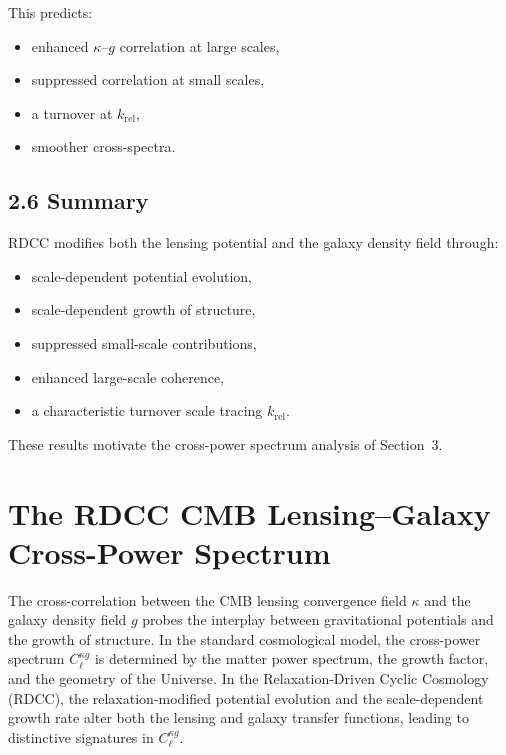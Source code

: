 \documentclass[11pt,a4paper]{article}
\begin{document}
This predicts:

\begin{itemize}
    \item enhanced $\kappa$–$g$ correlation at large scales,
    \item suppressed correlation at small scales,
    \item a turnover at $k_{\mathrm{rel}}$,
    \item smoother cross-spectra.
\end{itemize}

\subsection*{2.6 Summary}

RDCC modifies both the lensing potential and the galaxy density field through:

\begin{itemize}
    \item scale-dependent potential evolution,
    \item scale-dependent growth of structure,
    \item suppressed small-scale contributions,
    \item enhanced large-scale coherence,
    \item a characteristic turnover scale tracing $k_{\mathrm{rel}}$.
\end{itemize}

These results motivate the cross-power spectrum analysis of Section~3.

\section{The RDCC CMB Lensing–Galaxy Cross-Power Spectrum}

The cross-correlation between the CMB lensing convergence field $\kappa$ and the galaxy 
density field $g$ probes the interplay between gravitational potentials and the growth of 
structure. In the standard cosmological model, the cross-power spectrum $C_{\ell}^{\kappa g}$ 
is determined by the matter power spectrum, the growth factor, and the geometry of the 
Universe. In the Relaxation-Driven Cyclic Cosmology (RDCC), the relaxation-modified 
potential evolution and the scale-dependent growth rate alter both the lensing and galaxy 
transfer functions, leading to distinctive signatures in $C_{\ell}^{\kappa g}$.
\end{document}
